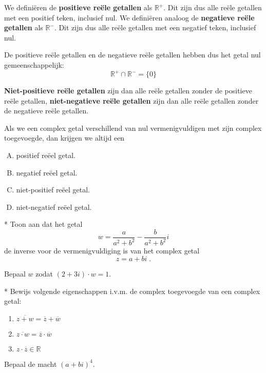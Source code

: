 \documentclass[12pt,twoside,a4paper]{article}
\begin{document}
\begin{oefening}
  We definiëren de {\bf positieve reële getallen} als $\mathbb{R}^+$. Dit zijn dus alle reële getallen met een positief teken, inclusief nul. We definiëren analoog de {\bf negatieve reële getallen} als $\mathbb{R}^-$. Dit zijn dus alle reële getallen met een negatief teken, inclusief nul.

  De positieve reële getallen en de negatieve reële getallen hebben dus het getal nul gemeenschappelijk:
  $$\mathbb{R}^+\cap\mathbb{R}^-=\{0\}$$

  {\bf Niet-positieve reële getallen} zijn dan alle reële getallen zonder de positieve reële getallen, {\bf niet-negatieve reële getallen} zijn dan alle reële getallen zonder de negatieve reële getallen.

  Als we een complex getal verschillend van nul vermenigvuldigen met zijn complex toegevoegde, dan krijgen we altijd een
  \begin{enumerate}[(A)]
  \item positief reëel getal.
  \item negatief reëel getal.
  \item niet-positief reëel getal.
  \item niet-negatief reëel getal.
  \end{enumerate}
\end{oefening}

\begin{oefening}*
Toon aan dat het getal
$$w=\dfrac{a}{a^2+b^2}-\dfrac{b}{a^2+b^2}i$$
de inverse voor de vermenigvuldiging is van het complex getal
$$z=a+bi\;.$$
\end{oefening}

\begin{oefening}
Bepaal $w$ zodat $(2+3i)\cdot w = 1$.
\end{oefening}

\begin{oefening}*
Bewijs volgende eigenschappen i.v.m. de complex toegevoegde van een complex getal:
\begin{enumerate}[a]
  \item $\overline{z+w}=\overline{z}+\overline{w}$
  \item $\overline{z\cdot w}=\overline{z}\cdot\overline{w}$
  \item $z\cdot\overline{z}\in\mathbb{R}$
\end{enumerate}
\end{oefening}

\begin{oefening}
Bepaal de macht $(a+bi)^4$.
\end{oefening}
\end{document}
